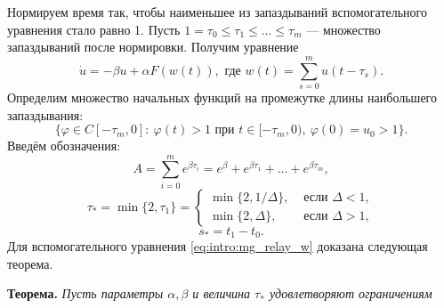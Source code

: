 Нормируем время так, чтобы наименьшее из запаздываний вспомогательного уравнения стало равно 1. Пусть $1 = \tau_0 \leq \tau_1 \leq \ldots \leq \tau_m$ --- множество запаздываний после нормировки. Получим уравнение 
\begin{equation}
	\label{eq:intro:mg_relay_w}
	\dot{u}=-\beta u+\alpha F(w(t)), \text{ где } w(t) = \sum\limits_{s = 0}^m u(t - \tau_s).
\end{equation}
%
Определим множество начальных функций на промежутке длины наибольшего запаздывания: 
%
\begin{equation}
	\label{eq:intro:mg_init_set}
	\{\varphi\in C[-\tau_{m},0]:\  \varphi(t)>1 \text{ при } t\in[-\tau_{m},0),\ \varphi(0)=u_0 > 1\}.
\end{equation}
%
Введём обозначения:
%
\begin{equation*}
	A = \sum_{i=0}^{m}e^{\beta \tau_{i}}=e^\beta+e^{\beta \tau_1}+\ldots+e^{\beta \tau_{m}},
\end{equation*}
\begin{equation*}
	\tau_* = \min\{2,\tau_1\}=\left\lbrace\begin{array}{cl}
		\min\{2,1/\Delta\}, & \text{ если } \Delta < 1,
		\\
		\min\{2,\Delta\}, & \text{ если } \Delta > 1,
	\end{array}\right.
\end{equation*}
\begin{equation*}
	s_* = t_1-t_0.
\end{equation*}
%
Для вспомогательного уравнения \eqref{eq:intro:mg_relay_w} доказана следующая теорема.

\textbf{Теорема.} \textit{Пусть параметры $\alpha, \beta$ и величина $\tau_*$ удовлетворяют ограничениям}

